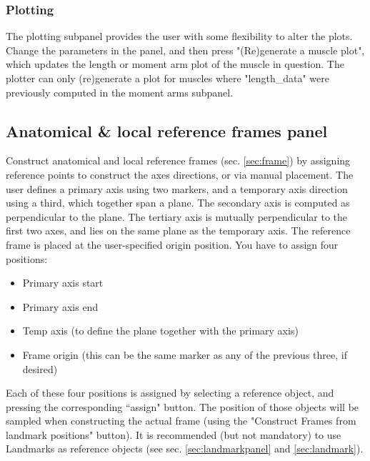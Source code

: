 \documentclass{article}
\begin{document}
\subsubsection{Plotting}
\label{sec:plotting}

The plotting subpanel provides the user with some flexibility to alter the plots. Change the parameters in the panel, and then press "(Re)generate a muscle plot", which updates the length or moment arm plot of the muscle in question. The plotter can only (re)generate a plot for muscles where "length\_data" were previously computed in the moment arms subpanel.

\FloatBarrier %

\subsection{Anatomical \& local reference frames panel}
\label{sec:framepanel}

Construct anatomical and local reference frames (sec. \ref{sec:frame}) by assigning reference points to construct the axes directions, or via manual placement. The user defines a primary axis using two markers, and a temporary axis direction using a third, which together span a plane. The secondary axis is computed as perpendicular to the plane. The tertiary axis is mutually perpendicular to the first two axes, and lies on the same plane as the temporary axis. The reference frame is placed at the user-specified origin position.
You have to assign four positions:

\begin{itemize}
\item Primary axis start
\item Primary axis end
\item Temp axis (to define the plane together with the primary axis)
\item Frame origin (this can be the same marker as any of the previous three, if desired)
\end{itemize}

Each of these four positions is assigned by selecting a reference object, and pressing the corresponding ``assign" button. The position of those objects will be sampled when constructing the actual frame (using the "Construct Frames from landmark positions" button). It is recommended (but not mandatory) to use Landmarks as reference objects (see sec. \ref{sec:landmarkpanel} and \ref{sec:landmark}).
\end{document}
